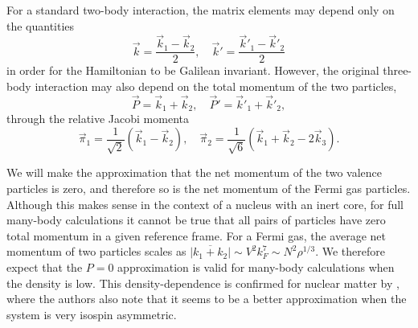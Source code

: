 For a standard two-body interaction, the matrix elements may depend only on the quantities
 \begin{equation}
 \vec{k}=\frac{\vec{k}_1-\vec{k}_2}{2},\quad \vec{k}'=\frac{\vec{k}'_1-\vec{k}'_2}{2}
 \end{equation}
 in order for the Hamiltonian to be Galilean invariant. However, the original three-body interaction may also depend on the total momentum of the two particles,
 \begin{equation}
 \vec{P}=\vec{k}_1+\vec{k}_2, \quad  \vec{P}'=\vec{k}'_1+\vec{k}'_2,
 \end{equation}
 through the relative Jacobi momenta 
 \begin{equation}
 \vec{\pi}_1=\frac{1}{\sqrt{2}}\left(\vec{k}_1-\vec{k}_2\right), \quad  \vec{\pi}_2=\frac{1}{\sqrt{6}}\left(\vec{k}_1+\vec{k}_2-2\vec{k}_3\right).
 \end{equation}
 
We will make the approximation that the net momentum of the two valence particles is zero, and therefore so is the net momentum of the Fermi gas particles. Although this makes sense in the context of a nucleus with an inert core, for full many-body calculations it cannot be true that all pairs of particles have zero total momentum in a given reference frame. For a Fermi gas, the average net momentum of two particles scales as 
$\overline{|k_1+k_2|} \sim V^2 k_F^7 
\sim N^2 \rho^{1/3}$. 
We therefore expect that the $P=0$ approximation is valid for many-body calculations when the density is low. This density-dependence is confirmed for nuclear matter by \cite{Drischler:2015eba}, where the authors also note that it seems to be a better approximation when the system is very isospin asymmetric. 
 
